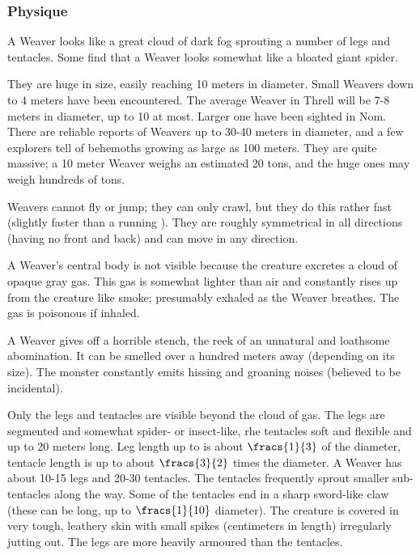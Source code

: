 

\subsubsection{Physique}
A Weaver looks like a great cloud of dark fog sprouting a number of legs and tentacles. Some find that a Weaver looks somewhat like a bloated giant spider. 

They are huge in size, easily reaching 10 meters in diameter. Small Weavers down to 4 meters have been encountered. The average Weaver in Threll will be 7-8 meters in diameter, up to 10 at most. Larger one have been sighted in Nom. There are reliable reports of Weavers up to 30-40 meters in diameter, and a few explorers tell of behemoths growing as large as 100 meters. They are quite massive; a 10 meter Weaver weighs an estimated 20 tons, and the huge ones may weigh hundreds of tons. 

Weavers cannot fly or jump; they can only crawl, but they do this rather fast (slightly faster than a running \human{}). They are roughly symmetrical in all directions (having no front and back) and can move in any direction. 

A Weaver's central body is not visible because the creature excretes a cloud of opaque gray gas. This gas is somewhat lighter than air and constantly rises up from the creature like smoke; presumably exhaled as the Weaver breathes. The gas is poisonous if inhaled. 

A Weaver gives off a horrible stench, the reek of an unnatural and loathsome abomination. It can be smelled over a hundred meters away (depending on its size). The monster constantly emits hissing and groaning noises (believed to be incidental). 

Only the legs and tentacles are visible beyond the cloud of gas. The legs are segmented and somewhat spider- or insect-like, rhe tentacles soft and flexible and up to 20 meters long. Leg length up to is about $\fracs{1}{3}$ of the diameter, tentacle length is up to about $\fracs{3}{2}$ times the diameter. A Weaver has about 10-15 legs and 20-30 tentacles. The tentacles frequently sprout smaller sub-tentacles along the way. Some of the tentacles end in a sharp sword-like claw (these can be long, up to $\fracs{1}{10}$ diameter). The creature is covered in very tough, leathery skin with small spikes (centimeters in length) irregularly jutting out. The legs are more heavily armoured than the tentacles. 


